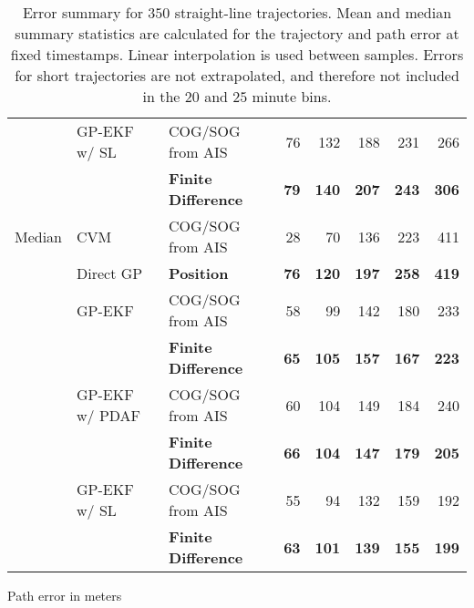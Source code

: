 \begin{table}
\begin{subtable}{\textwidth}
{\begin{tabular}{lllrrrrr}
                        & GP-EKF w/ SL   & COG/SOG from AIS      & 76      & 132     & 188     & 231     & 266     \\
                        &                & \bf Finite Difference & \bf 79  & \bf 140 & \bf 207 & \bf 243 & \bf 306 \\
                \midrule
                Median  & CVM            & COG/SOG from AIS      & 28      & 70      & 136     & 223     & 411     \\
                        & Direct GP      & \bf Position          & \bf 76  & \bf 120 & \bf 197 & \bf 258 & \bf 419 \\
                        & GP-EKF         & COG/SOG from AIS      & 58      & 99      & 142     & 180     & 233     \\
                        &                & \bf Finite Difference & \bf 65  & \bf 105 & \bf 157 & \bf 167 & \bf 223 \\
                        & GP-EKF w/ PDAF & COG/SOG from AIS      & 60      & 104     & 149     & 184     & 240     \\
                        &                & \bf Finite Difference & \bf 66  & \bf 104 & \bf 147 & \bf 179 & \bf 205 \\
                        & GP-EKF w/ SL   & COG/SOG from AIS      & 55      & 94      & 132     & 159     & 192     \\
                        &                & \bf Finite Difference & \bf 63  & \bf 101 & \bf 139 & \bf 155 & \bf 199 \\
                \bottomrule
            \end{tabular}


        }
        \caption{Path error in meters}
        \label{table:stats_straight_path_err}
    \end{subtable}
    \caption{Error summary for $350$ straight-line trajectories. Mean and median summary statistics are calculated for the trajectory and path error at fixed timestamps. Linear interpolation is used between samples. Errors for short trajectories are not extrapolated, and therefore not included in the $20$ and $25$ minute bins.}
    \label{table:stats_straight_line_error}
\end{table}

